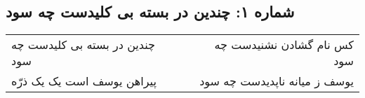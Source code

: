 \begin{center}
\section*{شماره ۱: چندین در بسته بی کلیدست چه سود}
\label{sec:001}
\begin{longtable}{l p{0.5cm} r}
چندین در بسته بی کلیدست چه سود
&&
کس نام گشادن نشنیدست چه سود
\\
پیراهن یوسف است یک یک ذرّه
&&
یوسف ز میانه ناپدیدست چه سود
\\
\end{longtable}
\end{center}
